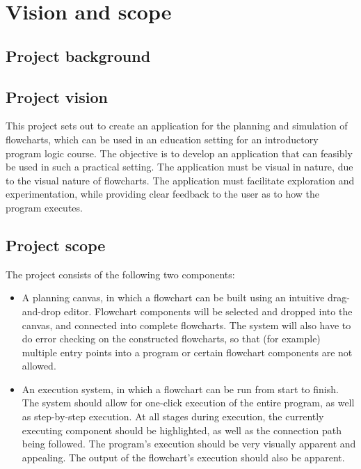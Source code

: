 \documentclass[11pt,a4paper,titlepage]{article}
\begin{document}


\tableofcontents
\pagebreak

\section{Vision and scope}
\subsection{Project background}
\subsection{Project vision}

This project sets out to create an application for the planning and simulation of flowcharts, which
can be used in an education setting for an introductory program logic course. The objective is to
develop an application that can feasibly be used in such a practical setting. The application must be
visual in nature, due to the visual nature of flowcharts. The application must facilitate exploration
and experimentation, while providing clear feedback to the user as to how the program executes.

\subsection{Project scope}

The project consists of the following two components:

\begin{itemize}
\item A planning canvas, in which a flowchart can be built using an intuitive drag-and-drop editor.
Flowchart components will be selected and dropped into the canvas, and connected into
complete flowcharts. The system will also have to do error checking on the constructed
flowcharts, so that (for example) multiple entry points into a program or certain flowchart
components are not allowed.
\item An execution system, in which a flowchart can be run from start to finish. The system
should allow for one-click execution of the entire program, as well as step-by-step
execution. At all stages during execution, the currently executing component should be
highlighted, as well as the connection path being followed. The program's execution should
be very visually apparent and appealing. The output of the flowchart's execution should also
be apparent.
\end{itemize}
\end{document}
